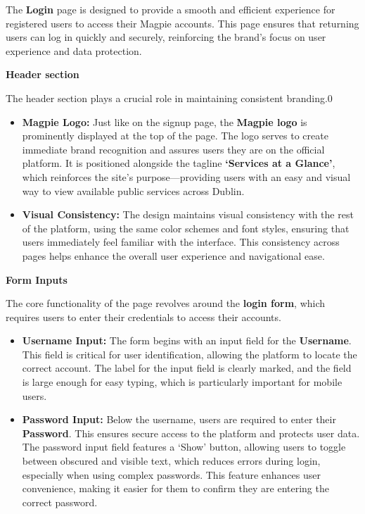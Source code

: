 The \textbf{Login} page is designed to provide a smooth and efficient experience for registered users to access their Magpie accounts. This page ensures that returning users can log in quickly and securely, reinforcing the brand’s focus on user experience and data protection.

\textbf{Header section}

The header section plays a crucial role in maintaining consistent branding.0
\begin{itemize}
    \item{} \textbf{Magpie Logo:} Just like on the signup page, the \textbf{Magpie logo} is prominently displayed at the top of the page. The logo serves to create immediate brand recognition and assures users they are on the official platform. It is positioned alongside the tagline \textbf{`Services at a Glance'}, which reinforces the site's purpose—providing users with an easy and visual way to view available public services across Dublin.
    \item{} \textbf{Visual Consistency:} The design maintains visual consistency with the rest of the platform, using the same color schemes and font styles, ensuring that users immediately feel familiar with the interface. This consistency across pages helps enhance the overall user experience and navigational ease. 
\end{itemize}

\textbf{Form Inputs}

The core functionality of the page revolves around the \textbf{login form}, which requires users to enter their credentials to access their accounts.

\begin{itemize}
    \item{} \textbf{Username Input:} The form begins with an input field for the \textbf{Username}. This field is critical for user identification, allowing the platform to locate the correct account. The label for the input field is clearly marked, and the field is large enough for easy typing, which is particularly important for mobile users.
    \item{} \textbf{Password Input:} Below the username, users are required to enter their \textbf{Password}. This ensures secure access to the platform and protects user data. The password input field features a `Show' button, allowing users to toggle between obscured and visible text, which reduces errors during login, especially when using complex passwords. This feature enhances user convenience, making it easier for them to confirm they are entering the correct password.
\end{itemize}

